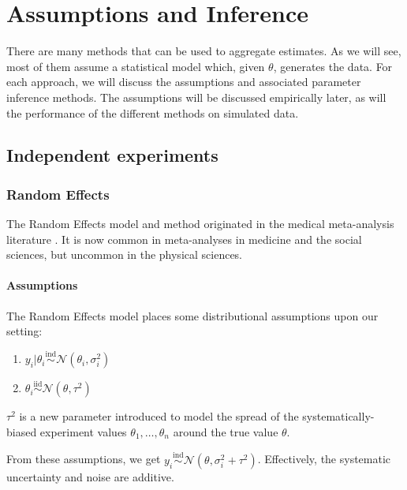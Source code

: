 \documentclass[12pt]{article}
\begin{document}
\section{Assumptions and Inference}\label{sec:methods}

There are many methods that can be used to aggregate estimates. As we will see, most of them assume a statistical model which, given $\theta$, generates the data. For each approach, we will discuss the assumptions and associated parameter inference methods. The assumptions will be discussed empirically later, as will the performance of the different methods on simulated data.

\subsection{Independent experiments}

\subsubsection{Random Effects}\label{random-effects}

The Random Effects model and method originated in the medical meta-analysis literature \citep{dersimonian1986meta}. It is now common in meta-analyses in medicine and the social sciences, but uncommon in the physical sciences.

\paragraph{Assumptions}\label{assumptions}

The Random Effects model places some distributional assumptions upon our setting:

\begin{enumerate}
\item
  $y_i|\theta_i\overset{\mathrm{ind}}{\sim}\mathcal{N}(\theta_i,\sigma_i^2)$
\item
  $\theta_i\overset{\mathrm{iid}}{\sim}\mathcal{N}(\theta,\tau^2)$
\end{enumerate}

$\tau^2$ is a new parameter introduced to model the spread of the systematically-biased experiment values $\theta_1,\ldots,\theta_n$ around the true value $\theta$.

From these assumptions, we get $y_i\overset{\mathrm{ind}}{\sim}\mathcal{N}(\theta,\sigma_i^2+\tau^2)$. Effectively, the systematic uncertainty and noise are additive.
\end{document}
